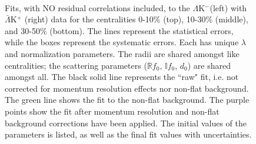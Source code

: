 \documentclass[../AnalysisNoteJBuxton.tex]{subfiles}
\begin{document}
\begin{figure}[h!]
  \centering
  \\  
  \caption[$\Lambda$K$^{-}$($\bar{\Lambda}$K$^{+}$) Fits with No Residuals]{Fits, with NO residual correlations included, to the $\Lambda$K$^{-}$(left) with $\bar{\Lambda}$K$^{+}$ (right) data for the centralities 0-10\% (top), 10-30\% (middle), and 30-50\% (bottom).
The lines represent the statistical errors, while the boxes represent the systematic errors.  
Each has unique $\lambda$ and normalization parameters.
The radii are shared amongst like centralities; the scattering parameters ($\mathbb{R}f_{0}$, $\mathbb{I}f_{0}$, $d_{0}$) are shared amongst all.
The black solid line represents the ``raw" fit, i.e. not corrected for momentum resolution effects nor non-flat background.  
The green line shows the fit to the non-flat background.
The purple points show the fit after momentum resolution and non-flat background corrections have been applied.
The initial values of the parameters is listed, as well as the final fit values with uncertainties.}
  \label{fig:LamKchMwConjFits_NoRes}
\end{figure}
\end{document}
